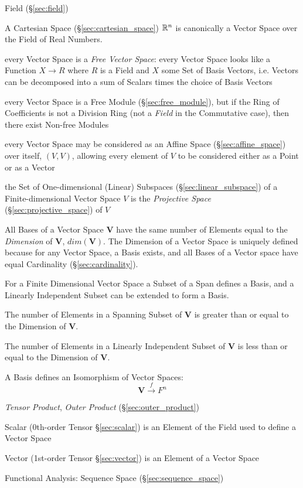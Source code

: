 Field (\S\ref{sec:field})

A Cartesian Space (\S\ref{sec:cartesian_space}) $\mathbb{R}^n$ is canonically a
Vector Space over the Field of Real Numbers.

every Vector Space is a \emph{Free Vector Space}: every Vector Space
looks like a Function $X \rightarrow R$ where $R$ is a Field and $X$
some Set of Basis Vectors, i.e. Vectors can be decomposed into a sum
of Scalars times the choice of Basis Vectors %

every Vector Space is a Free Module (\S\ref{sec:free_module}), but if the Ring
of Coefficients is not a Division Ring (not a \emph{Field} in the Commutative
case), then there exist Non-free Modules

every Vector Space may be considered as an Affine Space
(\S\ref{sec:affine_space}) over itself, $(V,V)$, allowing every element of $V$
to be considered either as a Point or as a Vector

the Set of One-dimensional (Linear) Subspaces (\S\ref{sec:linear_subspace}) of a
Finite-dimensional Vector Space $V$ is the \emph{Projective Space}
(\S\ref{sec:projective_space}) of $V$

All Bases of a Vector Space $\mathbf{V}$ have the same number of
Elements equal to the \emph{Dimension} of $\mathbf{V}$,
$dim(\mathbf{V})$. The Dimension of a Vector Space is uniquely defined
because for any Vector Space, a Basis exists, and all Bases of a
Vector space have equal Cardinality (\S\ref{sec:cardinality}).

For a Finite Dimensional Vector Space a Subset of a Span defines a
Basis, and a Linearly Independent Subset can be extended to form a
Basis.

The number of Elements in a Spanning Subset of $\mathbf{V}$ is greater
than or equal to the Dimension of $\mathbf{V}$.

The number of Elements in a Linearly Independent Subset of
$\mathbf{V}$ is less than or equal to the Dimension of $\mathbf{V}$.

A Basis defines an Isomorphism of Vector Spaces:
\[
    \mathbf{V} \xrightarrow{f} F^n
\]

\emph{Tensor Product}, \emph{Outer Product} (\S\ref{sec:outer_product})

Scalar (0th-order Tensor \S\ref{sec:scalar}) is an Element of the
Field used to define a Vector Space

Vector (1st-order Tensor \S\ref{sec:vector}) is an Element of a Vector
Space

Functional Analysis: Sequence Space (\S\ref{sec:sequence_space})

